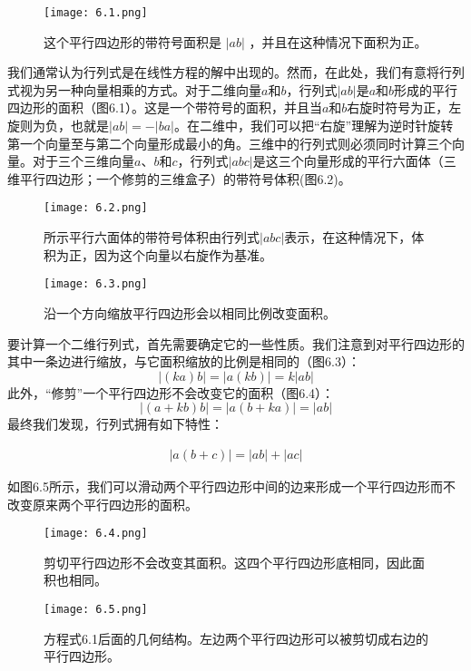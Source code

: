 \documentclass[lang=cn,12pt]{elegantbook}
\begin{document}
\begin{figure}[htbp]
  \centering
  \texttt{[image: 6.1.png]}
  \caption{这个平行四边形的带符号面积是 $|ab|$ ，并且在这种情况下面积为正。}
\end{figure}

我们通常认为行列式是在线性方程的解中出现的。然而，在此处，我们有意将行列式视为另一种向量相乘的方式。对于二维向量$a$和$b$，行列式$|ab|$是$a$和$b$形成的平行四边形的面积（图6.1）。这是一个带符号的面积，并且当$a$和$b$右旋时符号为正，左旋则为负，也就是$|ab| = -|ba|$。在二维中，我们可以把“右旋”理解为逆时针旋转第一个向量至与第二个向量形成最小的角。三维中的行列式则必须同时计算三个向量。对于三个三维向量$a$、$b$和$c$，行列式$|abc|$是这三个向量形成的平行六面体（三维平行四边形；一个修剪的三维盒子）的带符号体积(图6.2)。

\begin{figure}[htbp]
  \centering
  \texttt{[image: 6.2.png]}
  \caption{所示平行六面体的带符号体积由行列式$|abc|$表示，在这种情况下，体积为正，因为这个向量以右旋作为基准。}
\end{figure}

\begin{figure}[htbp]
  \centering
  \texttt{[image: 6.3.png]}
  \caption{沿一个方向缩放平行四边形会以相同比例改变面积。}
\end{figure}

要计算一个二维行列式，首先需要确定它的一些性质。我们注意到对平行四边形的其中一条边进行缩放，与它面积缩放的比例是相同的（图6.3）：$$|(ka)b| =  |a(kb)| = k|ab|$$此外，“修剪”一个平行四边形不会改变它的面积（图6.4）：$$|(a+kb)b| =  |a(b+ka)| = |ab|$$最终我们发现，行列式拥有如下特性：

\begin{align}
  |a(b+c)| =  |ab| + |ac|
\end{align}

如图6.5所示，我们可以滑动两个平行四边形中间的边来形成一个平行四边形而不改变原来两个平行四边形的面积。

\begin{figure}[htbp]
  \centering
  \texttt{[image: 6.4.png]}
  \caption{剪切平行四边形不会改变其面积。这四个平行四边形底相同，因此面积也相同。}
\end{figure}

\begin{figure}[htbp]
  \centering
  \texttt{[image: 6.5.png]}
  \caption{方程式6.1后面的几何结构。左边两个平行四边形可以被剪切成右边的平行四边形。}
\end{figure}
\end{document}
